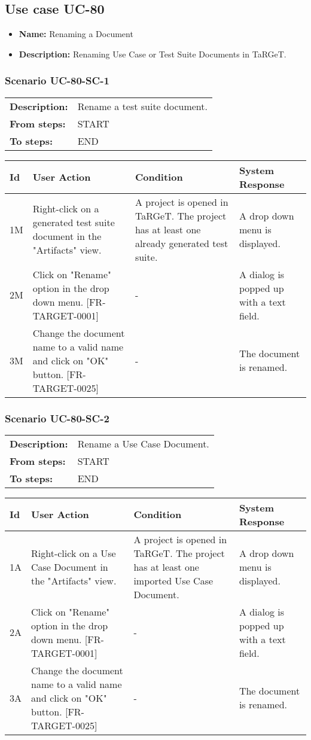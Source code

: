 \documentclass[a4paper,11pt]{article}
\newcommand{\bl}{\\ \hline}
\begin{document}
\subsection*{Use case UC-80}
\begin{itemize}
\item {\bf Name: }Renaming a Document
\item {\bf Description: }Renaming Use Case or Test Suite Documents in TaRGeT.
\end{itemize}
\subsubsection*{Scenario UC-80-SC-1}
\begin{tabular}{p{1in}p{4in}}
{\bf Description:} & Rename a test suite document. \\
{\bf From steps:} & START \\
{\bf To steps:} & END \\
\end{tabular}
 
\begin{tabular}{|p{0.8in}|p{1.6in}|p{1.6in}|p{1.6in}|}
\hline
Id & User Action & Condition & System Response  \bl 
1M & Right-click on a generated test suite document in the "Artifacts" view. & A project is opened in TaRGeT. The project has at least one already generated test suite. & A drop down menu is displayed. \bl 
2M & Click on "Rename" option in the drop down menu. [FR-TARGET-0001] & - & A dialog is popped up with a text field. \bl 
3M & Change the document name to a valid name and click on "OK" button. [FR-TARGET-0025] & - & The document is renamed. \bl 
\end{tabular}
\subsubsection*{Scenario UC-80-SC-2}
\begin{tabular}{p{1in}p{4in}}
{\bf Description:} & Rename a Use Case Document. \\
{\bf From steps:} & START \\
{\bf To steps:} & END \\
\end{tabular}
 
\begin{tabular}{|p{0.8in}|p{1.6in}|p{1.6in}|p{1.6in}|}
\hline
Id & User Action & Condition & System Response  \bl 
1A & Right-click on a Use Case Document in the "Artifacts" view. & A project is opened in TaRGeT. The project has at least one imported Use Case Document. & A drop down menu is displayed. \bl 
2A & Click on "Rename" option in the drop down menu. [FR-TARGET-0001] & - & A dialog is popped up with a text field. \bl 
3A & Change the document name to a valid name and click on "OK" button. [FR-TARGET-0025] & - & The document is renamed. \bl 
\end{tabular}
\end{document}
